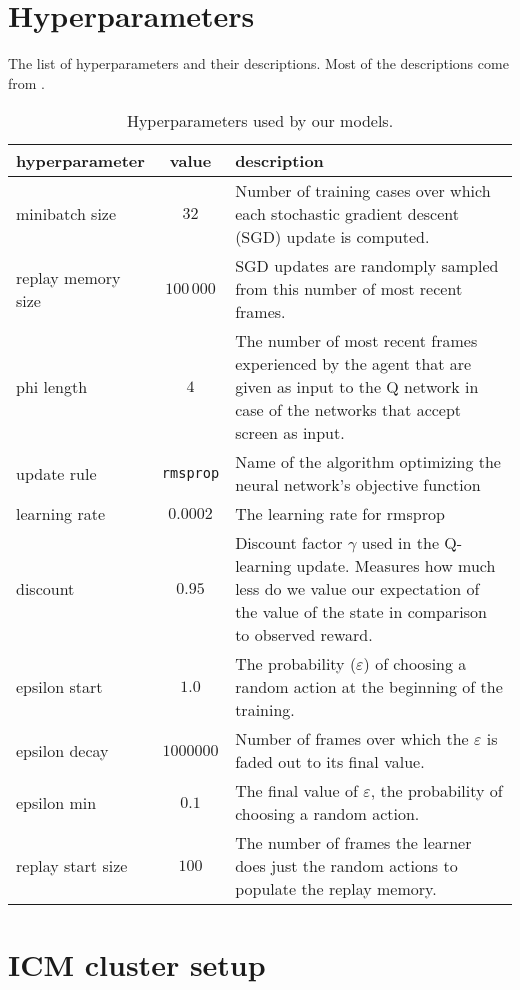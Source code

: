 \begin{appendices}
\chapter{Hyperparameters}\label{hyperparams}
The list of hyperparameters and their descriptions. Most of the descriptions come from \cite{nature-dqn}.
\begin{table}[h]
\begin{tabularx}{\textwidth}{@{} l c Y @{}}
\toprule
hyperparameter & value & description \\
\midrule
minibatch size & $32$ & Number of training cases over which each stochastic gradient descent (SGD) update is computed. \\\addlinespace
replay memory size & $100\,000$ & SGD updates are randomply sampled from this number of most recent frames. \\\addlinespace
phi length & $4$ & The number of most recent frames experienced by the agent that are given as input to the Q network in case of the networks that accept screen as input. \\\addlinespace
update rule & \texttt{rmsprop} &  Name of the algorithm optimizing the neural network's objective function   \\ \addlinespace
learning rate &  $0.0002$  & The learning rate for rmsprop\\ \addlinespace
discount & $0.95$ & Discount factor $\gamma$ used in the Q-learning update. Measures how much less do we value our expectation of the value of the state in comparison to observed reward.\\\addlinespace
epsilon start & $1.0$ & The probability ($\varepsilon$) of choosing a random action at the beginning of the training. \\\addlinespace
epsilon decay & $1000000$ & Number of frames over which the $\varepsilon$ is faded out to its final value. \\\addlinespace
epsilon min & $0.1$ & The final value of $\varepsilon$, the probability of choosing a random action. \\\addlinespace
replay start size & $100$ & The number of frames the learner does just the random actions to populate the replay memory.\\
\bottomrule
\end{tabularx}
\caption{Hyperparameters used by our models.}
\label{table:param}
\end{table}

\chapter{ICM cluster setup}\label{icm}
\end{appendices}
